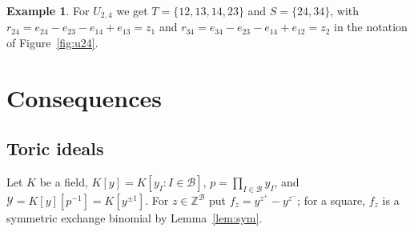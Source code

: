 \documentclass[11pt,a4paper]{article}
\theoremstyle{plain}
\theoremstyle{definition}
\newtheorem{example}[theorem]{Example}
\newcommand{\Z}{\mathbb Z}
\newcommand{\bs}{\mathcal B}
\begin{document}
\begin{example}\label{ex:u24}
For $U_{2,4}$ we get $T=\{12,13,14,23\}$ and $S=\{24,34\}$, with $r_{24}=e_{24}-e_{23}-e_{14}+e_{13}=z_1$ and $r_{34}=e_{34}-e_{23}-e_{14}+e_{12}=z_2$ in the notation of Figure~\ref{fig:u24}.
\end{example}


\section{Consequences}\label{sec:apps}
\subsection{Toric ideals}
Let $K$ be a field, $K[y]=K[y_I:I\in\bs]$, $p=\prod_{I\in\bs}y_I$, and $\mathcal Y=K[y][p^{-1}]=K[y^{\pm1}]$. For $z\in\Z^{\bs}$ put $f_z=y^{z^+}-y^{z^-}$; for a square, $f_z$ is a symmetric exchange binomial by Lemma~\ref{lem:sym}.
\end{document}
